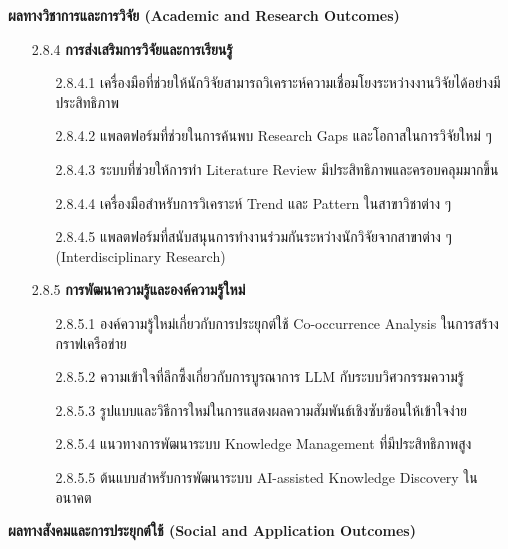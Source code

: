 \documentclass[12pt,a4paper]{article}
\begin{document}
\begin{enumerate}[leftmargin=2cm]
{        \vspace{0.2cm}

        \textbf{ผลทางวิชาการและการวิจัย (Academic and Research Outcomes)}

        \begin{enumerate}
            \item[2.8.4] \textbf{การส่งเสริมการวิจัยและการเรียนรู้}
            \begin{enumerate}
                \item[2.8.4.1] เครื่องมือที่ช่วยให้นักวิจัยสามารถวิเคราะห์ความเชื่อมโยงระหว่างงานวิจัยได้อย่างมีประสิทธิภาพ
                \item[2.8.4.2] แพลตฟอร์มที่ช่วยในการค้นพบ Research Gaps และโอกาสในการวิจัยใหม่ ๆ
                \item[2.8.4.3] ระบบที่ช่วยให้การทำ Literature Review มีประสิทธิภาพและครอบคลุมมากขึ้น
                \item[2.8.4.4] เครื่องมือสำหรับการวิเคราะห์ Trend และ Pattern ในสาขาวิชาต่าง ๆ
                \item[2.8.4.5] แพลตฟอร์มที่สนับสนุนการทำงานร่วมกันระหว่างนักวิจัยจากสาขาต่าง ๆ (Interdisciplinary Research)
            \end{enumerate}

            \item[2.8.5] \textbf{การพัฒนาความรู้และองค์ความรู้ใหม่}
            \begin{enumerate}
                \item[2.8.5.1] องค์ความรู้ใหม่เกี่ยวกับการประยุกต์ใช้ Co-occurrence Analysis ในการสร้างกราฟเครือข่าย
                \item[2.8.5.2] ความเข้าใจที่ลึกซึ้งเกี่ยวกับการบูรณาการ LLM กับระบบวิศวกรรมความรู้
                \item[2.8.5.3] รูปแบบและวิธีการใหม่ในการแสดงผลความสัมพันธ์เชิงซับซ้อนให้เข้าใจง่าย
                \item[2.8.5.4] แนวทางการพัฒนาระบบ Knowledge Management ที่มีประสิทธิภาพสูง
                \item[2.8.5.5] ต้นแบบสำหรับการพัฒนาระบบ AI-assisted Knowledge Discovery ในอนาคต
            \end{enumerate}
        \end{enumerate}

        \vspace{0.8cm}

        \textbf{ผลทางสังคมและการประยุกต์ใช้ (Social and Application Outcomes)}

}
\end{enumerate}
\end{document}
